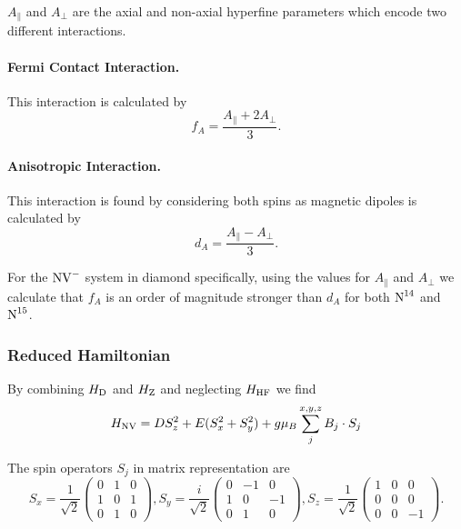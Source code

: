 $A_\parallel$ and $A_\perp$ are the axial and non-axial hyperfine parameters which encode two different interactions. 

\paragraph{Fermi Contact Interaction.}
This interaction is calculated by 
\begin{equation}
    f_A = \frac{A_\parallel + 2 A_\perp}{3}.
    \label{eq:fermi_contact}
\end{equation}

\paragraph{Anisotropic Interaction.}
This interaction is found by considering both spins as magnetic dipoles is calculated by 
\begin{equation}
    d_A = \frac{A_\parallel - A_\perp}{3}.
    \label{eq:anisotropic}
\end{equation}

For the $\ce{NV^-}$ system in diamond specifically, using the values for $A_\parallel$ and $A_\perp$ we calculate that $f_A$ is an order of magnitude stronger than $d_A$ for both $\ce{N^{14}}$ and $\ce{N^{15}}$. 

\subsubsection{Reduced Hamiltonian}
By combining $H_{\ce{D}}$ and $H_{\ce{Z}}$ 
and neglecting $H_{\ce{HF}}$ 
we find 
\begin{equation}
    H_{\ce{NV}} = D S_z^2 + E(S_x^2 + S_y^2) + g \mu_B \sum_{j}^{x,y,z} B_j \cdot S_j 
    \label{eq:reduced_H_NV}
\end{equation}

The spin operators $S_j$ in matrix representation are 
\begin{equation}
    S_x = \frac{1}{\sqrt{2}} \begin{pmatrix}
        0 & 1 & 0 \\ 
        1 & 0 & 1 \\ 
        0 & 1 & 0
    \end{pmatrix}, 
    S_y = \frac{i}{\sqrt{2}} \begin{pmatrix}
        0 & -1 & 0 \\ 
        1 & 0 & -1 \\ 
        0 & 1 & 0
    \end{pmatrix}, 
    S_z = \frac{1}{\sqrt{2}} \begin{pmatrix}
        1 & 0 & 0 \\ 
        0 & 0 & 0 \\ 
        0 & 0 & -1
    \end{pmatrix}. 
    \label{eq:spin_operators}
\end{equation}

